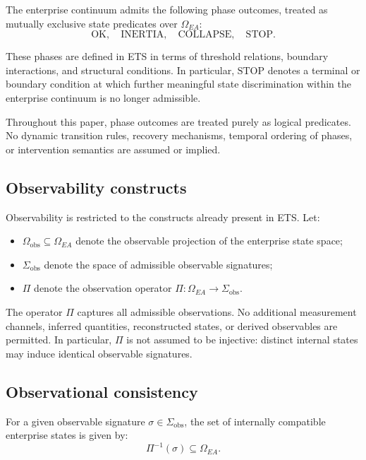 The enterprise continuum admits the following phase outcomes, treated
as mutually exclusive state predicates over $\Omega_{EA}$:
\[
\text{OK}, \quad \text{INERTIA}, \quad \text{COLLAPSE}, \quad \text{STOP}.
\]

These phases are defined in ETS in terms of threshold relations,
boundary interactions, and structural conditions. In particular,
$\text{STOP}$ denotes a terminal or boundary condition at which further
meaningful state discrimination within the enterprise continuum is no
longer admissible.

Throughout this paper, phase outcomes are treated purely as logical
predicates. No dynamic transition rules, recovery mechanisms, temporal
ordering of phases, or intervention semantics are assumed or implied.

\subsection{Observability constructs}
\label{subsec:observability-constructs}

Observability is restricted to the constructs already present in ETS.
Let:
\begin{itemize}
\item $\Omega_{\mathrm{obs}} \subseteq \Omega_{EA}$ denote the observable
      projection of the enterprise state space;
\item $\Sigma_{\mathrm{obs}}$ denote the space of admissible observable
      signatures;
\item $\Pi$ denote the observation operator
      $\Pi : \Omega_{EA} \rightarrow \Sigma_{\mathrm{obs}}$.
\end{itemize}

The operator $\Pi$ captures all admissible observations. No additional
measurement channels, inferred quantities, reconstructed states, or
derived observables are permitted. In particular, $\Pi$ is not assumed
to be injective: distinct internal states may induce identical
observable signatures.

\subsection{Observational consistency}
\label{subsec:observational-consistency}

For a given observable signature
$\sigma \in \Sigma_{\mathrm{obs}}$, the set of internally compatible
enterprise states is given by:
\[
\Pi^{-1}(\sigma) \subseteq \Omega_{EA}.
\]

